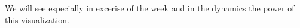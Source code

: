 We will see especially in excerise of the week and in the dynamics the power of this visualization. 
